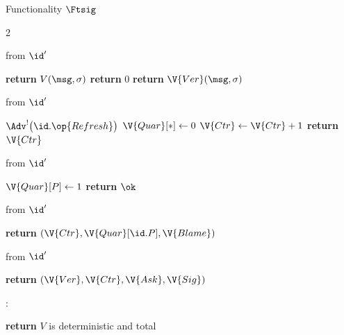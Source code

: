 \begin{interface}[nofloat]{Functionality $\Ftsig$ \\
}
{\begin{multicols}{2}
\columnbreak

 \quad from $\id'$
\begin{algorithmic}[1]
\algcont
{}
\State \textbf{return} $V(\msg, \sigma)$ \label{ln:tsigforeign}
\EndIf
{}
\State \textbf{return} $0$ \label{ln:tsigunforge}
\EndIf
\State \textbf{return} $\V{Ver}(\msg, \sigma)$ \label{ln:tsigconsist}
\algsave
\end{algorithmic}
\vspace{1.4ex}

 \quad from $\id'$
\begin{algorithmic}[1]
\algcont
{}
\State $\Adv^{!}\bigl(\id.\op{Refresh}\bigr)$
\State $\V{Quar}[*] \gets 0$ \label{ln:tsigrefresh}
\State $\V{Ctr} \gets \V{Ctr} + 1$
\State \textbf{return} $\V{Ctr}$
\algsave
\end{algorithmic}
\vspace{1.4ex}

 \quad from $\id'$
\begin{algorithmic}[1]
\algcont
{} \label{ln:tsigquar}
\State $\V{Quar}[P] \gets 1$
\State \textbf{return} $\ok$
\algsave
\end{algorithmic}
\vspace{1.4ex}

 \quad from $\id'$
\begin{algorithmic}[1]
\algcont
\State \textbf{return} $(\V{Ctr}, \V{Quar}[\id.P], \V{Blame})$
\algsave
\end{algorithmic}
\vspace{1.4ex}

 \quad from $\id'$
\begin{algorithmic}[1]
\algcont
\State \textbf{return} $(\V{Ver}, \V{Ctr}, \V{Ask}, \V{Sig})$ \label{ln:tsigleak}
\algsave
\end{algorithmic}
\vspace{1.4ex}

:
\begin{algorithmic}[1]
\algcont
\State \textbf{return} $V$ is deterministic and total \label{ln:tsigclean}
\algsave
\end{algorithmic}
\end{multicols}}
\end{interface}
